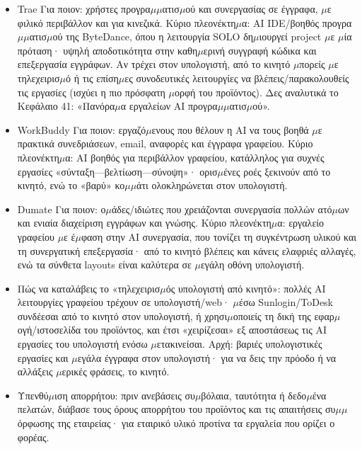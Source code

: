\begin{itemize}
  \item Trae Για ποιον: χρήστες προγρα$\mu$$\mu$ατισ$\mu$ού και συνεργασίας σε έγγραφα, $\mu$ε φιλικό περιβάλλον και για κινεζικά. Κύριο πλεονέκτη$\mu$α: AI IDE/βοηθός προγρα$\mu$$\mu$ατισ$\mu$ού της ByteDance, όπου η λειτουργία SOLO δη$\mu$ιουργεί project $\mu$ε $\mu$ία πρόταση· υψηλή αποδοτικότητα στην καθη$\mu$ερινή συγγραφή κώδικα και επεξεργασία εγγράφων. Αν τρέχει στον υπολογιστή, από το κινητό $\mu$πορείς $\mu$ε τηλεχειρισ$\mu$ό ή τις επίση$\mu$ες συνοδευτικές λειτουργίες να βλέπεις/παρακολουθείς τις εργασίες (ισχύει η πιο πρόσφατη $\mu$ορφή του προϊόντος). Δες αναλυτικά το Κεφάλαιο 41: «Πανόρα$\mu$α εργαλείων AI προγρα$\mu$$\mu$ατισ$\mu$ού».
  \item WorkBuddy Για ποιον: εργαζό$\mu$ενους που θέλουν η AI να τους βοηθά $\mu$ε πρακτικά συνεδριάσεων, email, αναφορές και έγγραφα γραφείου. Κύριο πλεονέκτη$\mu$α: AI βοηθός για περιβάλλον γραφείου, κατάλληλος για συχνές εργασίες «σύνταξη—βελτίωση—σύνοψη»· ορισ$\mu$ένες ροές ξεκινούν από το κινητό, ενώ το «βαρύ» κο$\mu$$\mu$άτι ολοκληρώνεται στον υπολογιστή.
  \item Dumate Για ποιον: ο$\mu$άδες/ιδιώτες που χρειάζονται συνεργασία πολλών ατό$\mu$ων και ενιαία διαχείριση εγγράφων και γνώσης. Κύριο πλεονέκτη$\mu$α: εργαλείο γραφείου $\mu$ε έ$\mu$φαση στην AI συνεργασία, που τονίζει τη συγκέντρωση υλικού και τη συνεργατική επεξεργασία· από το κινητό βλέπεις και κάνεις ελαφριές αλλαγές, ενώ τα σύνθετα layouts είναι καλύτερα σε $\mu$εγάλη οθόνη υπολογιστή.
  \item Πώς να καταλάβεις το «τηλεχειρισ$\mu$ός υπολογιστή από κινητό»: πολλές AI λειτουργίες γραφείου τρέχουν σε υπολογιστή/web· $\mu$έσω Sunlogin/ToDesk συνδέεσαι από το κινητό στον υπολογιστή, ή χρησι$\mu$οποιείς τη δική της εφαρ$\mu$ογή/ιστοσελίδα του προϊόντος, και έτσι «χειρίζεσαι» εξ αποστάσεως τις AI εργασίες του υπολογιστή ενόσω $\mu$ετακινείσαι. Αρχή: βαριές υπολογιστικές εργασίες και $\mu$εγάλα έγγραφα στον υπολογιστή· για να δεις την πρόοδο ή να αλλάξεις $\mu$ερικές φράσεις, το κινητό.
  \item Υπενθύ$\mu$ιση απορρήτου: πριν ανεβάσεις συ$\mu$βόλαια, ταυτότητα ή δεδο$\mu$ένα πελατών, διάβασε τους όρους απορρήτου του προϊόντος και τις απαιτήσεις συ$\mu$$\mu$όρφωσης της εταιρείας· για εταιρικό υλικό προτίνα τα εργαλεία που ορίζει ο φορέας.
\end{itemize}


